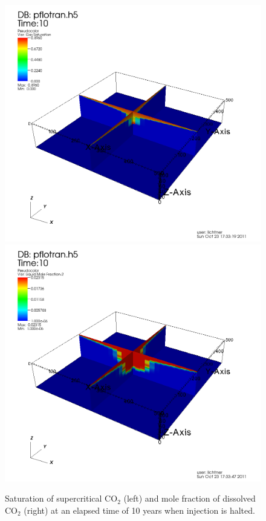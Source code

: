 \documentclass[12pt]{article}
\begin{document}
\begin{figure}[h]
\includegraphics[scale=0.25]{./figs/sg-10y.png}
\includegraphics[scale=0.25]{./figs/xlco2-10y.png}
\caption{Saturation of supercritical CO$_2$ (left) and mole fraction of dissolved CO$_2$ (right) at an elapsed time of 10 years when injection is halted.}\label{f10y}
\end{figure}
\end{document}
